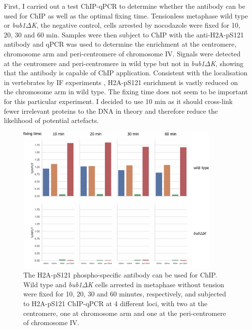 First, I carried out a test ChIP-qPCR to determine whether the antibody can be used for ChIP as well as the optimal fixing time. Tensionless metaphase wild type or \textit{bub1$\Delta$K}, the negative control, cells arrested by nocodazole were fixed for 10, 20, 30 and 60 \si{\minute}. Samples were then subject to ChIP with the anti-H2A-pS121 antibody and qPCR was used to determine the enrichment at the centromere, chromosome arm and peri-centromere of chromosome IV. Signals were detected at the centromere and peri-centromere in wild type but not in \textit{bub1$\Delta$K}, showing that the antibody is capable of ChIP application. Consistent with the localisation in vertebrates by IF experiments \citep{Ricke2012, Kawashima2010a, Liu2013a, Williams2017Bub1Kinetochores, Zhang2020FunctioningMitosis, Liang2019ACells, Lee2008, Liu2015}, H2A-pS121 enrichment is vastly reduced on the chromosome arm in wild type. The fixing time does not seem to be important for this particular experiment. I decided to use 10 \si{\minute} as it should cross-link fewer irrelevant proteins to the DNA in theory and therefore reduce the likelihood of potential artefacts. 

\begin{figure}[htbp]
  \centering
  \includegraphics[width=0.9\textwidth]{chapter3/figures/pH2A test ChIP-qPCR.pdf}
  \caption[The H2A-pS121 phospho-specific antibody can be used for ChIP]{The H2A-pS121 phospho-specific antibody can be used for ChIP. Wild type and \textit{bub1$\Delta$K} cells arrested in metaphase without tension were fixed for 10, 20, 30 and 60 minutes, respectively, and subjected to H2A-pS121 ChIP-qPCR at 4 different loci, with two at the centromere, one at chromosome arm and one at the peri-centromere of chromosome IV. }
  \label{fig:ph2atestchipqpcr}
\end{figure}

